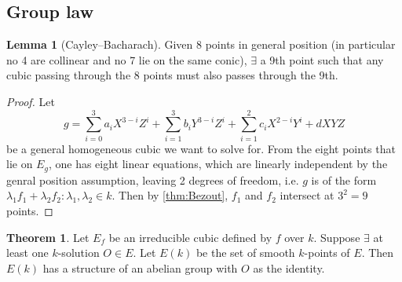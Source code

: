 \documentclass{article}
\theoremstyle{definition}
\newtheorem{thm}[defn]{Theorem}
\newtheorem{lemma}[defn]{Lemma}
\begin{document}
\subsection{Group law}
\begin{lemma}[Cayley--Bacharach]
Given 8 points in general position (in particular no 4 are collinear and no 7 lie on the same conic), $\exists$ a 9th point such that any cubic passing through the 8 points must also passes through the 9th.
\end{lemma}

\begin{minipage}{0.4\textwidth}
\begin{center}
\end{center}
\end{minipage}
\begin{minipage}{0.6\textwidth}
\begin{proof}
Let
\[
g=\sum_{i=0}^{3}a_i X^{3-i}Z^i + \sum_{i=1}^{3}b_i Y^{3-i}Z^i + \sum_{i=1}^2 c_i X^{2-i}Y^i + dXYZ
\]
be a general homogeneous cubic we want to solve for. From the eight points that lie on $E_g$, one has eight linear equations, which are linearly independent by the genral position assumption, leaving 2 degrees of freedom, i.e. $g$ is of the form $\lambda_1f_1+\lambda_2f_2:\lambda_1,\lambda_2\in k$. Then by \ref{thm:Bezout}, $f_1$ and $f_2$ intersect at $3^2=9$ points.
\end{proof}
\end{minipage}

\begin{thm}
Let $E_f$ be an irreducible cubic defined by $f$ over $k$. Suppose $\exists$ at least one $k$-solution $O\in E$. Let $E(k)$ be the set of smooth $k$-points of $E$. Then $E(k)$ has a structure of an abelian group with $O$ as the identity.
\end{thm}
\end{document}

